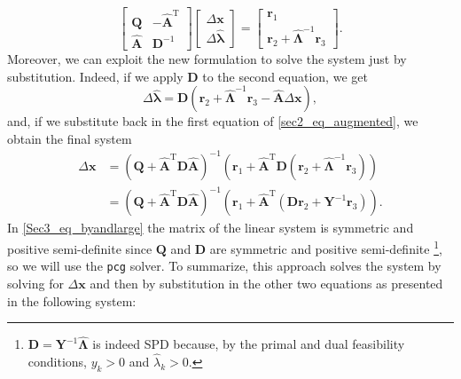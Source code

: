 \begin{equation} \tag{Aug}\label{sec2_eq_augmented}
    \begin{bmatrix}
            \mathbf{Q} & -\hat{\mathbf{A}}^\mathrm{T} \\
            \hat{\mathbf{A}} & \mathbf{D}^{-1}
        \end{bmatrix}
        \begin{bmatrix}
            \Delta \bm{x}\\ \Delta \hat{\bm{\lambda}}
        \end{bmatrix} = 
        \begin{bmatrix}
            \bm{r}_1 \\ \bm{r}_2 + \hat{\mathbf{\Lambda}}^{-1}\bm{r}_3
        \end{bmatrix}.
\end{equation}
Moreover, we can exploit the new formulation to solve the system just by substitution. Indeed, if we apply $\mathbf{D}$ to the second equation, we get 
\begin{equation}
    \Delta \hat{\bm{\lambda}} = \mathbf{D}\left( \bm{r}_2 + \hat{\mathbf{\Lambda}}^{-1}\bm{r}_3 - \hat{\mathbf{A}}\Delta \bm{x} \right), \label{Sec3_Eq_antisemitismo}
\end{equation}
and, if we substitute back in the first equation of \eqref{sec2_eq_augmented}, we obtain the final system
\begin{align}
    \Delta \bm{x} &= \left( \mathbf{Q} + \hat{\mathbf{A}}^\mathrm{T}\mathbf{D}\hat{\mathbf{A}}\right)^{-1}\left( \bm{r}_1 + \hat{\mathbf{A}}^\mathrm{T}\mathbf{D}\left( \bm{r}_2 + \hat{\mathbf{\Lambda}}^{-1}\bm{r}_3 \right)\right) \nonumber\\
    &= \left( \mathbf{Q} + \hat{\mathbf{A}}^\mathrm{T}\mathbf{D}\hat{\mathbf{A}}\right)^{-1}\left( \bm{r}_1 + \hat{\mathbf{A}}^\mathrm{T}\left( \mathbf{D}\bm{r}_2 + \mathbf{Y}^{-1}\bm{r}_3 \right)\right). \label{Sec3_eq_byandlarge}
\end{align}
In \eqref{Sec3_eq_byandlarge} the matrix of the linear system is symmetric and positive semi-definite since $\mathbf{Q}$ and $\mathbf{D}$ are symmetric and positive semi-definite \footnote{$\mathbf{D} = \mathbf{Y}^{-1}\hat{\mathbf{\Lambda}}$ is indeed SPD because, by the primal and dual feasibility conditions, $y_k > 0$ and $\hat{\lambda}_k > 0$.}, so we will use the \texttt{pcg} solver.
To summarize, this approach solves the system by solving for $\Delta \bm{x}$ and then by substitution in the other two equations as presented in the following system:
